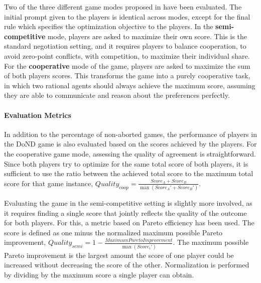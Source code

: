Two of the three different game modes proposed in \cite{DBLP:journals/corr/abs-2406-18872} have been evaluated. The initial prompt given to the players is identical across modes, except for the final rule which specifies the optimization objective to the players.
In the \textbf{semi-competitive} mode, players are asked to maximize their own score. This is the standard negotiation setting, and it requires players to balance cooperation, to avoid zero-point conflicts, with competition, to maximize their individual share.
For the \textbf{cooperative} mode of the game, players are asked to maximize the sum of both players scores. This transforms the game into a purely cooperative task, in which two rational agents should always achieve the maximum score, assuming they are able to communicate and reason about the preferences perfectly.

\paragraph{Evaluation Metrics}

In addition to the percentage of non-aborted games, the performance of players in the DoND game is also evaluated based on the scores achieved by the players.
For the cooperative game mode, assessing the quality of agreement is straightforward. Since both players try to optimize for the same total score of both players, it is sufficient to use the ratio between the achieved total score to the maximum total score for that game instance, $\mathit{Quality}_\mathit{coop} = \frac{\mathit{Score}_A + \mathit{Score}_B}{\max ( \mathit{Score}_A' + \mathit{Score}_B' )}$.

Evaluating the game in the semi-competitive setting is slightly more involved, as it requires finding a single score that jointly reflects the quality of the outcome for both players. For this, a metric based on Pareto efficiency has been used. The score is defined as one minus the normalized maximum possible Pareto improvement, $\mathit{Quality}_\mathit{semi} = 1 - \frac{\mathit{Maximum Pareto Improvement}}{\max ( \mathit{Score}_i' )}$. The maximum possible Pareto improvement is the largest amount the score of one player could be increased without decreasing the score of the other. Normalization is performed by dividing by the maximum score a single player can obtain.
